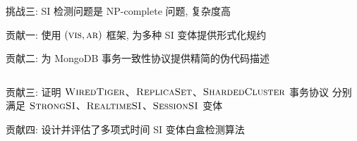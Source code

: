 \begin{frame}{}
  \begin{center}
	挑战三: SI 检测问题是 \textsf{NP-complete} 问题, 复杂度高

	\vspace{0.60cm}
  \end{center}
\end{frame}

\begin{frame}{}
  \begin{center}
	贡献一: 使用 $(\textsc{vis}, \textsc{ar})$ 框架, 为多种 SI 变体提供形式化规约
  \end{center}
\end{frame}

\begin{frame}{}
  \begin{center}
	贡献二: 为 MongoDB 事务一致性协议提供精简的伪代码描述
  \end{center}

  \vspace{0.50cm}
  \begin{columns}
  \end{columns}
\end{frame}

\begin{frame}{}
  \begin{center}
	贡献三: 证明 $\textsc{WiredTiger}$、$\textsc{ReplicaSet}$、$\textsc{ShardedCluster}$ 事务协议
	  分别满足 $\textsc{StrongSI}$、$\textsc{RealtimeSI}$、$\textsc{SessionSI}$ 变体
  \end{center}

\end{frame}

\begin{frame}{}
  \begin{center}
	贡献四: 设计并评估了多项式时间 SI 变体白盒检测算法
  \end{center}

\end{frame}
